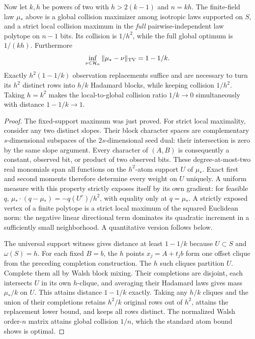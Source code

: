\begin{theorem}
\label{s25:thm:design-concentrated-trap}
Now let $k,h$ be powers of two with $h>2(k-1)$ and $n=kh$.
The finite-field law $\mu_*$ above is a global collision maximizer among
isotropic laws supported on $S$, and a strict local collision maximum
in the \emph{full} pairwise-independent law polytope on $n-1$ bits.
Its collision is $1/h^2$, while the full global optimum is $1/(kh)$.
Furthermore
\[
 \inf_{\nu\in\mathcal H_n}\|\mu_*-\nu\|_{\rm TV}=1-1/k.
\]
Exactly $h^2(1-1/k)$ observation replacements suffice and are necessary
to turn its $h^2$ distinct rows into $h/k$ Hadamard blocks, while keeping
collision $1/h^2$. Taking $h=k^2$ makes the local-to-global collision
ratio $1/k\to0$ simultaneously with distance $1-1/k\to1$.
\end{theorem}
\begin{proof}
The fixed-support maximum was just proved. For strict local maximality,
consider any two distinct slopes. Their block character spaces are
complementary $s$-dimensional subspaces of the $2s$-dimensional seed
dual: their intersection is zero by the same slope argument. Every
character of $(A,B)$ is consequently a constant, observed bit, or product
of two observed bits. These degree-at-most-two real monomials span all
functions on the $h^2$-atom support $U$ of $\mu_*$. Exact first and second
moments therefore determine every weight on $U$ uniquely.
A uniform measure with this property strictly exposes itself by its
own gradient: for feasible $q$,
$\mu_*\cdot(q-\mu_*)=-q(U^c)/h^2$, with equality only at $q=\mu_*$.
A strictly exposed vertex of a finite polytope is a strict local maximum
of the squared Euclidean norm: the negative linear directional term
dominates its quadratic increment in a sufficiently small neighborhood.
A quantitative version follows below.

The universal support witness gives distance at least $1-1/k$ because
$U\subset S$ and $\omega(S)=h$. For each fixed $B=b$, the $h$ points
$x_j=A+t_jb$ form one offset clique from the preceding completion
construction. The $h$ such cliques partition $U$. Complete them all by
Walsh block mixing. Their completions are disjoint, each intersects $U$
in its own $h$-clique, and averaging their Hadamard laws gives mass
$\mu_*/k$ on $U$. This attains distance $1-1/k$ exactly. Taking any
$h/k$ cliques and the union of their completions retains $h^2/k$ original
rows out of $h^2$, attains the replacement lower bound, and keeps all
rows distinct. The normalized Walsh order-$n$ matrix attains global
collision $1/n$, which the standard atom bound shows is optimal.
\end{proof}

